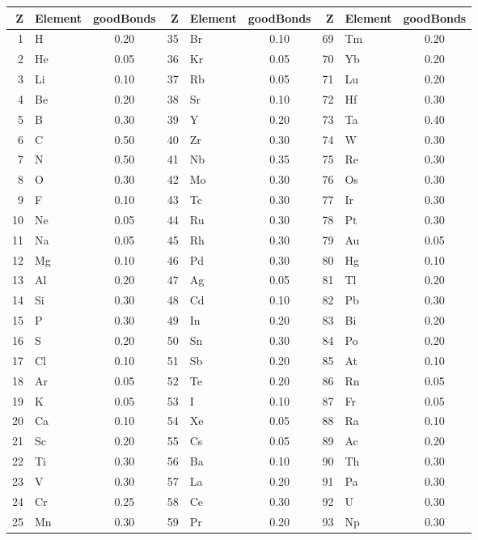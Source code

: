 \documentclass[12pt]{article}
\begin{document}
\begin{center}
\begin{tabular}{|r|l|c||r|l|c||r|l|c|}
\hline
Z & Element & goodBonds & Z & Element & goodBonds & Z & Element & goodBonds \\
\hline
 1 & H   & 0.20  & 35 & Br  & 0.10 &  69 & Tm  & 0.20 \\
 2 & He  & 0.05  & 36 & Kr  & 0.05 &  70 & Yb  & 0.20 \\
 3 & Li  & 0.10  & 37 & Rb  & 0.05 &  71 & Lu  & 0.20 \\
 4 & Be  & 0.20  & 38 & Sr  & 0.10 &  72 & Hf  & 0.30 \\
 5 & B   & 0.30  & 39 & Y   & 0.20 &  73 & Ta  & 0.40 \\
 6 & C   & 0.50  & 40 & Zr  & 0.30 &  74 & W   & 0.30 \\
 7 & N   & 0.50  & 41 & Nb  & 0.35 &  75 & Re  & 0.30 \\
 8 & O   & 0.30  & 42 & Mo  & 0.30 &  76 & Os  & 0.30 \\
 9 & F   & 0.10  & 43 & Tc  & 0.30 &  77 & Ir  & 0.30 \\
10 & Ne  & 0.05  & 44 & Ru  & 0.30 &  78 & Pt  & 0.30 \\
11 & Na  & 0.05  & 45 & Rh  & 0.30 &  79 & Au  & 0.05 \\
12 & Mg  & 0.10  & 46 & Pd  & 0.30 &  80 & Hg  & 0.10 \\
13 & Al  & 0.20  & 47 & Ag  & 0.05 &  81 & Tl  & 0.20 \\
14 & Si  & 0.30  & 48 & Cd  & 0.10 &  82 & Pb  & 0.30 \\
15 & P   & 0.30  & 49 & In  & 0.20 &  83 & Bi  & 0.20 \\
16 & S   & 0.20  & 50 & Sn  & 0.30 &  84 & Po  & 0.20 \\
17 & Cl  & 0.10  & 51 & Sb  & 0.20 &  85 & At  & 0.10 \\
18 & Ar  & 0.05  & 52 & Te  & 0.20 &  86 & Rn  & 0.05 \\
19 & K   & 0.05  & 53 & I   & 0.10 &  87 & Fr  & 0.05 \\
20 & Ca  & 0.10  & 54 & Xe  & 0.05 &  88 & Ra  & 0.10 \\
21 & Sc  & 0.20  & 55 & Cs  & 0.05 &  89 & Ac  & 0.20 \\
22 & Ti  & 0.30  & 56 & Ba  & 0.10 &  90 & Th  & 0.30 \\
23 & V   & 0.30  & 57 & La  & 0.20 &  91 & Pa  & 0.30 \\
24 & Cr  & 0.25  & 58 & Ce  & 0.30 &  92 & U   & 0.30 \\
25 & Mn  & 0.30  & 59 & Pr  & 0.20 &  93 & Np  & 0.30 \\

\end{tabular}
\end{center}
\end{document}
